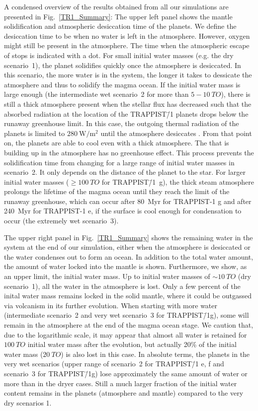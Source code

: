 \documentclass[paper=letterpaper,fontsize=12pt,oneside,twocolumn]{article}
\newcommand{\eg}{e.g. }
\begin{document}
A condensed overview of the results obtained from all our simulations are presented in Fig.~\ref{TR1_Summary}:
The upper left panel shows the mantle solidification and atmospheric desiccation time of the planets.
We define the desiccation time to be when no water is left in the atmosphere. 
However, oxygen might still be present in the atmosphere.
The time when the atmospheric escape of  stops is indicated with a dot.
For small initial water masses (\eg the dry scenario~1), the planet solidifies quickly once the atmosphere is desiccated. 
In this scenario, the more water is in the system, the longer it takes to dessicate the atmosphere and thus to solidify the magma ocean.
If the initial water mass is large enough (the intermediate wet scenario~2 for more than $5-\SI{10}{TO}$), there is still a thick  atmosphere present when the stellar flux has decreased such that the absorbed radiation at the location of the TRAPPIST\=/1 planets drops below the runaway greenhouse limit. 
In this case, the outgoing thermal radiation of the planets is limited to $\SI{280}{\watt\per\square\metre}$ until the atmosphere desiccates \citep[Section \ref{Sec_Flux}][]{Goldblatt2013}.
From that point on, the planets are able to cool even with a thick atmosphere.
The  that is building up in the atmosphere has no greenhouse effect.
This process prevents the solidification time from changing for a large range of initial water masses in scenario~2. 
It only depends on the distance of the planet to the star.
For larger initial water masses ($\ge \SI{100}{TO}$ for TRAPPIST\=/1~g), the thick steam atmosphere prolongs the lifetime of the magma ocean until they reach the limit of the runaway greenhouse, which can occur after 80~Myr for TRAPPIST-1 g and after 240~Myr for TRAPPIST-1 e, if the surface is cool enough for  condensation to occur (the extremely wet scenario~3).

The upper right panel in  Fig.~\ref{TR1_Summary} shows the remaining water in the system at the end of our simulation, either when the atmosphere is desiccated or the water condenses out to form an ocean.
In addition to the total water amount, the amount of water locked into the mantle is shown. 
Furthermore, we show, as an upper limit, the initial water mass.
Up to initial water masses of $\sim \SI{10}{TO}$ (dry scenario~1), all the water in the atmosphere is lost. Only a few percent of the inital water mass remains locked in the solid mantle, where it could be outgassed via volcanism in its further evolution.
When starting with more water (intermediate scenario~2 and very wet scenario~3 for TRAPPIST\=/1g), some will remain in the atmosphere at the end of the magma ocean stage.
We caution that, due to the logarithmic scale, it may appear that almost all water is retained for $\SI{100}{TO}$ initial water mass after the evolution, but actually 20\% of the initial water mass ($\SI{20}{TO}$) is also lost in this case. 
In absolute terms, the planets in the very wet scenarios (upper range of scenario~2 for TRAPPIST\=/1 e, f and scenario~3 for TRAPPIST\=/1g) lose approximately the same amount of water or more than in the dryer cases. Still a much larger fraction of the initial water content remains in the planets (atmosphere and mantle) compared to the very dry scenarios 1.
\end{document}
